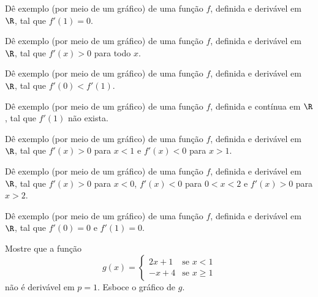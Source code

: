 \begin{exercicio}[7]
\label{ex:7.2.7}
Dê exemplo (por meio de um gráfico) de uma função $f$, definida e derivável em $\R$, tal que $f'(1) = 0$.
\end{exercicio}

\begin{exercicio}[8]
\label{ex:7.2.8}
Dê exemplo (por meio de um gráfico) de uma função $f$, definida e derivável em $\R$, tal que $f'(x) > 0$ para todo $x$.
\end{exercicio}

\begin{exercicio}[9]
\label{ex:7.2.9}
Dê exemplo (por meio de um gráfico) de uma função $f$, definida e derivável em $\R$, tal que $f'(0) < f'(1)$.
\end{exercicio}

\begin{exercicio}[10]
\label{ex:7.2.10}
Dê exemplo (por meio de um gráfico) de uma função $f$, definida e contínua em $\R$, tal que $f'(1)$ não exista.
\end{exercicio}

\begin{exercicio}[11]
\label{ex:7.2.11}
Dê exemplo (por meio de um gráfico) de uma função $f$, definida e derivável em $\R$, tal que $f'(x) > 0$ para $x < 1$ e $f'(x) < 0$ para $x > 1$.
\end{exercicio}

\begin{exercicio}[12]
\label{ex:7.2.12}
Dê exemplo (por meio de um gráfico) de uma função $f$, definida e derivável em $\R$, tal que $f'(x) > 0$ para $x < 0$, $f'(x) < 0$ para $0 < x < 2$ e $f'(x) > 0$ para $x > 2$.
\end{exercicio}

\begin{exercicio}[13]
\label{ex:7.2.13}
Dê exemplo (por meio de um gráfico) de uma função $f$, definida e derivável em $\R$, tal que $f'(0) = 0$ e $f'(1) = 0$.
\end{exercicio}

\begin{exercicio}[14]
\label{ex:7.2.14}
Mostre que a função
\[
g(x) = \begin{cases} 
2x + 1 & \text{se } x < 1 \\ 
-x + 4 & \text{se } x \ge 1 
\end{cases}
\]
não é derivável em $p = 1$. Esboce o gráfico de $g$.
\end{exercicio}

